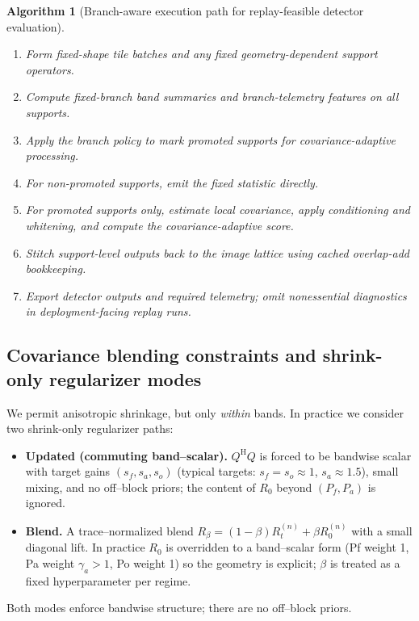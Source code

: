 \documentclass[11pt]{article}
\newcommand{\Hh}{^{\mathrm{H}}}
\newcommand{\Pf}{P_f}
\newcommand{\Pa}{P_a}
\newtheorem{algorithm}{Algorithm}
\begin{document}
\begin{algorithm}[Branch-aware execution path for replay-feasible detector evaluation]
\label{alg:runtime_execution_path}
\begin{enumerate}[nosep,leftmargin=1.5em,label=\arabic*.]
  \item Form fixed-shape tile batches and any fixed geometry-dependent support operators.
  \item Compute fixed-branch band summaries and branch-telemetry features on all supports.
  \item Apply the branch policy to mark promoted supports for covariance-adaptive processing.
  \item For non-promoted supports, emit the fixed statistic directly.
  \item For promoted supports only, estimate local covariance, apply conditioning and whitening, and compute the covariance-adaptive score.
  \item Stitch support-level outputs back to the image lattice using cached overlap-add bookkeeping.
  \item Export detector outputs and required telemetry; omit nonessential diagnostics in deployment-facing replay runs.
\end{enumerate}
\end{algorithm}

\subsection{Covariance blending constraints and shrink-only regularizer modes}

We permit anisotropic shrinkage, but only \emph{within} bands. In practice we consider two shrink-only regularizer paths:
\begin{itemize}[nosep]
  \item \textbf{Updated (commuting band--scalar).} $Q\Hh Q$ is forced to be bandwise scalar with target gains $(s_f,s_a,s_o)$ (typical targets: $s_f=s_o\approx 1$, $s_a\approx 1.5$), small mixing, and no off--block priors; the content of $R_0$ beyond $(\Pf,\Pa)$ is ignored.
  \item \textbf{Blend.} A trace--normalized blend $R_\beta = (1-\beta) R_t^{(n)} + \beta R_0^{(n)}$ with a small diagonal lift. In practice $R_0$ is overridden to a band--scalar form (Pf weight 1, Pa weight $\gamma_a>1$, Po weight 1) so the geometry is explicit; $\beta$ is treated as a fixed hyperparameter per regime.
\end{itemize}
Both modes enforce bandwise structure; there are no off--block priors.
\end{document}
